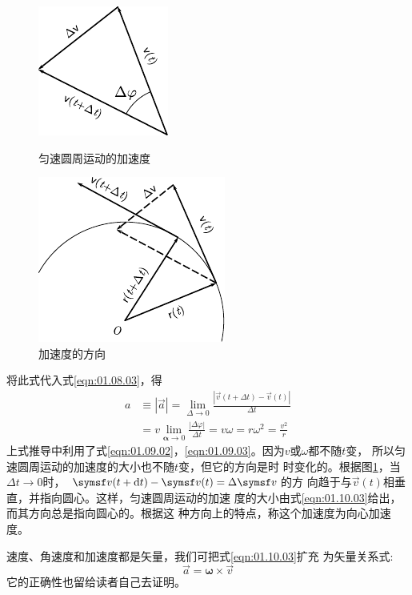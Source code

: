 \begin{figure}[!h]
    \small\centering
    \begin{minipage}[b]{14em}
        \includegraphics{figure/fig01.22}
        \vspace{1em}
        \caption{匀速圆周运动的加速度}
        \label{fig:01.22}
    \end{minipage}
    \begin{minipage}[b]{14em}
        \centering
        \includegraphics{figure/fig01.23}
        \caption{加速度的方向}
        \label{fig:01.23}
    \end{minipage}
\end{figure}
\noindent 将此式代入式\eqref{eqn:01.08.03}，得
\begin{equation}\label{eqn:01.10.03}
    \begin{aligned}
        a & \equiv|\vec{a}|=\lim _{\Delta \rightarrow 0} \frac{|\vec{v}(t+\Delta t)-\vec{v}(t)|}{\Delta t} \\
        &=v\lim_{\boldsymbol{\alpha} \rightarrow 0} \frac{|\Delta \varphi|}{\Delta t}=v \omega=r \omega^{2}=\frac{v^{2}}{r}
    \end{aligned}
\end{equation}\vspace{0.5em}
上式推导中利用了式\eqref{eqn:01.09.02}，\eqref{eqn:01.09.03}。因为$v$或$\omega$都不随$t$变，
所以匀速圆周运动的加速度的大小也不随$t$变，但它的方向是时
时变化的。根据图\ref{fig:01.23}，当$\Delta t\rightarrow 0$时，
$\vec{v}(t+\diff t)-\vec{v}(t)=\Delta\vec{v}$的方
向趋于与$\vec{v}(t)$相垂直，并指向圆心。这样，匀速圆周运动的加速
度的大小由式\eqref{eqn:01.10.03}给出，而其方向总是指向圆心的。根据这
种方向上的特点，称这个加速度为向心加速度。

速度、角速度和加速度都是矢量，我们可把式\eqref{eqn:01.10.03}扩充
为矢量关系式:
\clearpage
~\vspace{-1.56em}
\begin{equation}\label{eqn:01.10.04}
    \vec{a}= \symbf{\omega}\times \vec{v}
\end{equation}
它的正确性也留给读者自己去证明。